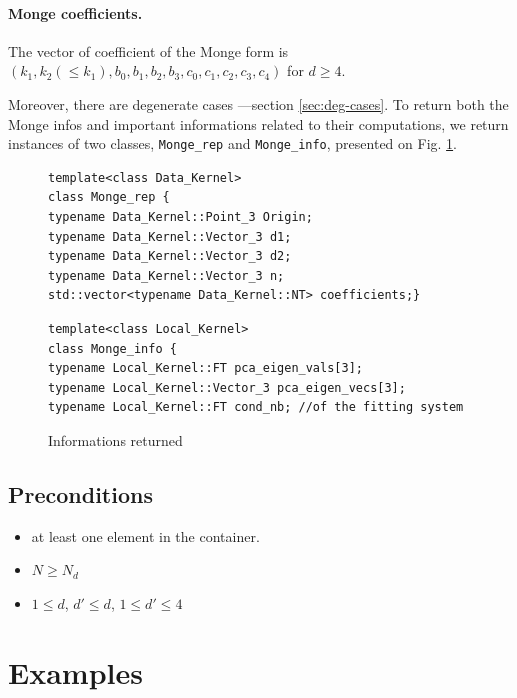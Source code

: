 \paragraph{Monge coefficients.}
The vector of coefficient of the Monge form is $(k_1, k_2 (\leq k_1),
b_0, b_1, b_2, b_3, c_0, c_1, c_2, c_3, c_4)$ for $d\geq 4$.

Moreover, there are degenerate cases ---section
\ref{sec:deg-cases}. To return both the Monge infos and important
informations related to their computations, we return instances of two
classes, {\tt Monge\_rep} and {\tt Monge\_info}, presented on
Fig. \ref{fig:outputs}.

\begin{figure}[H] 
\begin{center}
\begin{verbatim}
template<class Data_Kernel>
class Monge_rep { 
typename Data_Kernel::Point_3 Origin; 
typename Data_Kernel::Vector_3 d1; 
typename Data_Kernel::Vector_3 d2;
typename Data_Kernel::Vector_3 n; 
std::vector<typename Data_Kernel::NT> coefficients;}
\end{verbatim}

\begin{verbatim}
template<class Local_Kernel>
class Monge_info { 
typename Local_Kernel::FT pca_eigen_vals[3];
typename Local_Kernel::Vector_3 pca_eigen_vecs[3];
typename Local_Kernel::FT cond_nb; //of the fitting system  
\end{verbatim}
\end{center}

\caption{Informations returned} 
\label{fig:outputs} 
\end{figure} 


\subsection{Preconditions}

\begin{itemize}
\item
at least one element in the container.
\item
$N \geq N_d$
\item
$1 \leq d$, $d' \leq d$, $1 \leq d' \leq 4$ 
\end{itemize}	
 

\section{Examples} 

